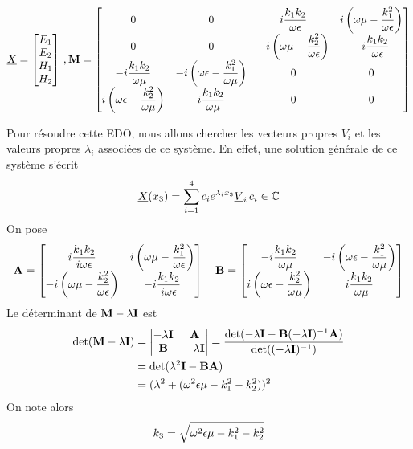 \begin{equation}
    \underline{X} = 
    \begin{bmatrix}
    E_1 \\ 
    E_2 \\ 
    H_1 \\ 
    H_2 \\
    \end{bmatrix}\,,
    \mathbf{M} = \begin{bmatrix}
    0 & 0 & i\dfrac{k_1k_2}{\omega\epsilon} & i\left(\omega\mu - \dfrac{k_1^2}{\omega\epsilon}\right)\\
    0 & 0 & -i\left(\omega\mu - \dfrac{k_2^2}{\omega\epsilon}\right) & -i\dfrac{k_1k_2}{\omega\epsilon}\\
    -i\dfrac{k_1k_2}{\omega\mu} & -i\left(\omega\epsilon - \dfrac{k_1^2}{\omega\mu}\right) & 0 & 0 \\
    i\left(\omega\epsilon - \dfrac{k_2^2}{\omega\mu}\right) & i\dfrac{k_1k_2}{\omega\mu} & 0 & 0 \\
    \end{bmatrix}
\end{equation}

Pour résoudre cette EDO, nous allons chercher les vecteurs propres $V_i$ et les valeurs propres $\lambda_i$ associées de ce système. En effet, une solution générale de ce système s'écrit
\begin{equation}
    \underline{X}(x_3)= \sum\limits_{i=1}^{4}c_i e^{\lambda_i x_3} \underline{V}_i \, c_i \in \mathbb C
\end{equation}
On pose 
\begin{equation}
    \mathbf{A} = \begin{bmatrix}
        i\dfrac{k_1k_2}{i\omega\epsilon} & i\left(\omega\mu - \dfrac{k_1^2}{\omega\epsilon}\right) \\
        -i\left(\omega\mu - \dfrac{k_2^2}{\omega\epsilon}\right) & -i\dfrac{k_1k_2}{i\omega\epsilon} \\
    \end{bmatrix}
    \quad
    \mathbf{B} = \begin{bmatrix}
        -i\dfrac{k_1k_2}{\omega\mu} & -i\left(\omega\epsilon - \dfrac{k_1^2}{\omega\mu}\right) \\
        i\left(\omega\epsilon - \dfrac{k_2^2}{\omega\mu}\right) & i\dfrac{k_1k_2}{\omega\mu} \\
    \end{bmatrix}
\end{equation}
Le déterminant de $\mathbf{M}-\lambda \mathbf{I}$ est
\begin{align*}
    \det(\mathbf{M}-\lambda \mathbf{I}) &= 
    \begin{vmatrix}
        -\lambda \mathbf{I} & \mathbf{A} \\
        \mathbf{B} & -\lambda \mathbf{I}
    \end{vmatrix}
        = \dfrac{\det(- \lambda \mathbf{I} - \mathbf{B}(-\lambda \mathbf{I})^{-1} \mathbf{A})}{\det((-\lambda \mathbf{I})^{-1})} \\
        &= \det(\lambda^2 \mathbf{I} - \mathbf{B}\mathbf{A}) \\
        &= (\lambda^2 + (\omega^2\epsilon\mu - k_1^2 -k_2^2))^2
\end{align*}
On note alors 
\begin{equation}
k_3=\sqrt{\omega^2\epsilon\mu - k_1^2 -k_2^2}
\end{equation}

